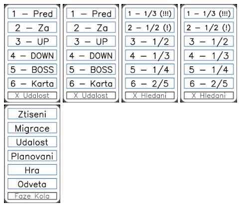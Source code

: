 \documentclass[a4paper]{article}
\begin{document}
	\includegraphics[width=3.0cm]{img-7_6}
	\includegraphics[width=3.0cm]{img-7_7}
	\includegraphics[width=3.0cm]{img-7_8}
	\includegraphics[width=3.0cm]{img-7_9}
	\includegraphics[width=3.0cm]{img-8_0}
\end{document}
